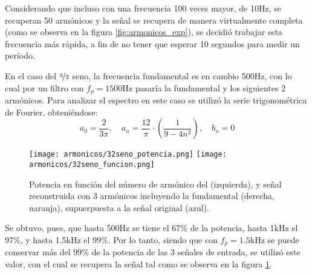 \documentclass{article}
\begin{document}
Considerando que incluso con una frecuencia 100 veces mayor, de 10Hz, se recuperan 50 arm\'onicos y la se\~nal se recupera de manera virtualmente completa (como se observa en la figura \ref{fig:armonicos_exp}), se decidi\'o trabajar esta frecuencia m\'as r\'apida, a fin de no tener que esperar 10 segundos para medir un per\'iodo.

En el caso del $\nicefrac{3}{2}$ seno, la frecuencia fundamental es en cambio 500Hz, con lo cual por un filtro con $f_p=1500\mathrm{Hz}$ pasar\'ia la fundamental y los siguientes 2 arm\'onicos. Para analizar el espectro en este caso se utiliz\'o la serie trigonom\'etrica de Fourier, obteni\'endose:
\[ a_0 = \frac{2}{3\pi},\quad a_n=\frac{12}{\pi} \cdot \left(\frac{1}{9-4n^2}\right) , \quad b_n=0 \]

\begin{figure}[htb]     
	\centering     
	\texttt{[image: armonicos/32seno\_potencia.png]}     
	\texttt{[image: armonicos/32seno\_funcion.png]}     
	\caption{Potencia en funci\'on del n\'umero de arm\'onico del  (izquierda), y se\~nal reconstruida con 3 arm\'onicos incluyendo la fundamental (derecha, naranja), supuerpuesta a la se\~nal original (azul).}     
	\label{fig:armonicos_32} 
\end{figure}

Se obtuvo, pues, que hasta 500Hz se tiene el 67\% de la potencia, hasta 1kHz el 97\%, y hasta 1.5kHz el 99\%. Por lo tanto, siendo que con $f_p=1.5\mathrm{kHz}$ se puede conservar m\'as del 99\% de la potencia de las 3 se\~nales de entrada, se utiliz\'o este valor, con el cual se recupera la se\~nal tal como se observa en la figura \ref{fig:armonicos_32}.
\end{document}
